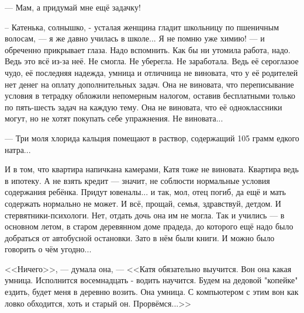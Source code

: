 
--- Мам, а придумай мне ещё задачку!

-- Катенька, солнышко, - усталая женщина гладит школьницу по пшеничным волосам, --- я же давно училась в школе...
Я не помню уже химию! --- и обреченно прикрывает глаза. Надо вспомнить. Как бы ни утомила работа, надо.
Ведь это всё из-за неё. Не смогла. Не уберегла. Не заработала.
Ведь её сероглазое чудо, её последняя надежда, умница и отличница не виновата,
что у её родителей нет денег на оплату дополнительных задач.
Она не виновата, что переписывание условия в тетрадку обложили непомерным налогом,
оставив бесплатными только по пять-шесть задач на каждую тему.
Она не виновата, что её одноклассники могут, но не хотят покупать себе упражнения. Не виновата...

--- Три моля хлорида кальция помещают в раствор, содержащий 105 грамм едкого натра...

И в том, что квартира напичкана камерами, Катя тоже не виновата. Квартира ведь в ипотеку.
А не взять кредит --- значит, не соблюсти нормальные условия содержания ребёнка.
Придут ювеналы... и так, мол, отец погиб, да ещё и мать содержать нормально не может.
И всё, прощай, семья, здравствуй, детдом. И стервятники-психологи. Нет, отдать дочь она им не могла.
Так и учились --- в основном летом, в старом деревянном доме прадеда,
до которого ещё надо было добраться от автобусной остановки.
Зато в нём были книги. И можно было говорить о чём угодно...

<<Ничего>>, --- думала она, --- <<Катя обязательно выучится.
Вон она какая умница. Исполнится восемнадцать - водить научится.
Будем на дедовой "копейке" ездить, будет меня в деревню возить. Она умница.
С компьютером с этим вон как ловко обходится, хоть и старый он. Прорвёмся...>>
